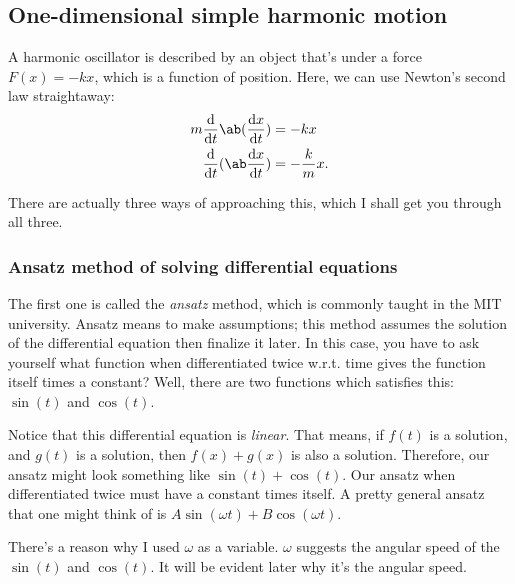 \subsection{One-dimensional simple harmonic motion}

A harmonic oscillator is described by an object that's under a force $F(x) = -kx$, which is a function of position. Here, we can use Newton's second law straightaway:
\begin{align}
	m\odv*{\ab(\odv{x}{t})}{t} &= -kx \\
	\odv*{(\ab\odv{x}{t})}{t} &= -\frac{k}{m}x. \label{eq:simpleharmonicmotion1}
\end{align}

There are actually three ways of approaching this, which I shall get you through all three.

\subsubsection{Ansatz method of solving differential equations}

The first one is called the \emph{ansatz} method, which is commonly taught in the MIT university. Ansatz means to make assumptions; this method assumes the solution of the differential equation then finalize it later. In this case, you have to ask yourself what function when differentiated twice w.r.t. time gives the function itself times a constant? Well, there are two functions which satisfies this: $\sin(t)$ and $\cos(t)$.

Notice that this differential equation is \emph{linear}. That means, if $f(t)$ is a solution, and $g(t)$ is a solution, then $f(x) + g(x)$ is also a solution. Therefore, our ansatz might look something like $\sin(t) + \cos(t)$. Our ansatz when differentiated twice must have a constant times itself. A pretty general ansatz that one might think of is $A\sin(\omega t) + B\cos(\omega t)$.

There's a reason why I used $\omega$ as a variable. $\omega$ suggests the angular speed of the $\sin(t)$ and $\cos(t)$. It will be evident later why it's the angular speed.

